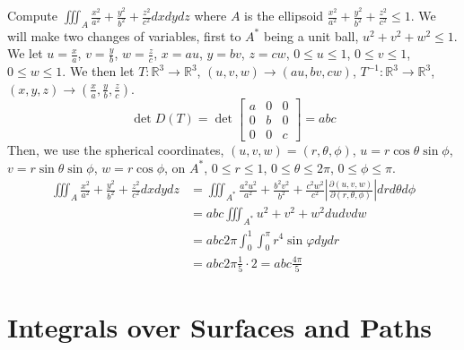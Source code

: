\documentclass[12pt]{book}
\theoremstyle{definition}
\theoremstyle{remark}
\begin{document}
\begin{example}
  Compute $\iiint_A \frac{x^2}{a^2} + \frac{y^2}{b^2} + \frac{z^2}{c^2} dx dy dz$ where $A$ is the ellipsoid $\frac{x^2}{a^2} + \frac{y^2}{b^2} + \frac{z^2}{c^2} \leq 1$. We will make two changes of variables, first to $A^*$ being a unit ball, $u^2 +v^2 +w^2 \leq 1$. We let $u = \frac{x}{a}$, $v = \frac{y}{b}$, $w = \frac{z}{c}$, $x = au$, $y = bv$, $z = cw$, $0 \leq u \leq 1$, $0 \leq v \leq 1$, $0 \leq w \leq 1$. We then let $T: \mathbb{R}^3 \rightarrow \mathbb{R}^3$, $(u,v,w) \rightarrow (au, bv, cw)$, $T^{-1}: \mathbb{R}^3 \rightarrow \mathbb{R}^3$, $(x,y,z) \rightarrow (\frac{x}{a}, \frac{y}{b}, \frac{z}{c})$. 
$$
\det D(T) = \det \begin{bmatrix} a & 0 & 0 \\ 0 & b & 0 \\ 0 & 0 & c \end{bmatrix} = abc
$$
\noindent Then, we use the spherical coordinates, $(u,v,w) = (r, \theta, \phi)$, $u = r \cos \theta \sin \phi$, $v = r \sin \theta \sin \phi$, $w = r \cos \phi$, on $A^*$, $0 \leq r \leq 1$, $0 \leq \theta \leq 2 \pi$, $0 \leq \phi \leq \pi$.
\begin{equation*}
  \begin{split}
  \iiint_A \frac{x^2}{a^2} + \frac{y^2}{b^2} + \frac{z^2}{c^2} dx dy dz &= \iiint_{A^*} \frac{a^2 u^2}{a^2} + \frac{b^2 v^2}{b^2} + \frac{c^2 w^2}{c^2} \left| \frac{\partial (u,v,w)}{\partial (r, \theta, \phi)} \right| dr d \theta d \phi \\ 
    &= abc \iiint_{A^*} u^2+v^2+w^2 d u d v d w\\
    &=a b c 2 \pi \int_0^1 \int_0^\pi r^4 \sin \varphi d y d r \\ 
    &=abc 2 \pi \frac{1}{5} \cdot 2=abc \frac{4 \pi}{5} 
  \end{split}
\end{equation*}


\end{example}
\chapter{Integrals over Surfaces and Paths}
\end{document}

